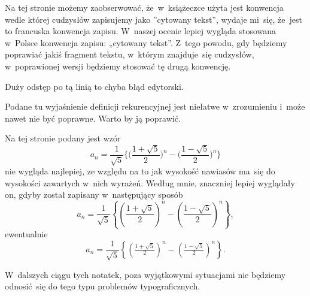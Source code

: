 \documentclass[a4paper,11pt]{article}
\numberwithin{equation}{section}
\begin{document}
\VerSpaceFour





\noindent
{} Na tej stronie możemy zaobserwować, że~w~książeczce użyta jest
konwencja wedle której cudzysłów zapisujemy jako ”cytowany tekst”, wydaje
mi~się, że~jest to francuska konwencja zapisu. W~naszej ocenie lepiej
wygląda stosowana w~Polsce konwencja zapisu: „cytowany tekst”. Z~tego
powodu, gdy będziemy poprawiać jakiś fragment tekstu, w~którym znajduje~się
cudzysłów, w~poprawionej wersji będziemy stosować tę drugą konwencję.

\VerSpaceFour





\noindent
{} Duży odstęp po tą linią to chyba błąd edytorski.

\VerSpaceFour





\noindent
{} Podane tu wyjaśnienie definicji rekurencyjnej jest niełatwe
w~zrozumieniu i~może nawet nie być poprawne. Warto by ją poprawić.

\VerSpaceFour





\noindent
{} Na tej stronie podany jest wzór
\begin{equation}
  \label{eq:Gancarzewicz-Arytmetyka-01}
  a_{ n } =
  \frac{ 1 }{ \sqrt{ 5 } }
  \Big\{ \Big( \frac{ 1 + \sqrt{ 5 } }{ 2 } \Big)^{ n }
  - \Big( \frac{ 1 - \sqrt{5} }{ 2 } \Big)^{ n } \Big\}
\end{equation}
nie wygląda najlepiej, ze względu na to jak wysokość nawiasów ma~się
do wysokości zawartych w~nich wyrażeń. Według mnie, znaczniej lepiej
wyglądały on, gdyby został zapisany w~następujący sposób
\begin{equation}
  \label{eq:Gancarzewicz-Arytmetyka-01}
  a_{ n } =
  \frac{ 1 }{ \sqrt{ 5 } }
  \left\{ \left( \frac{ 1 + \sqrt{ 5 } }{ 2 } \right)^{ n }
  - \left( \frac{ 1 - \sqrt{5} }{ 2 } \right)^{ n } \right\},
\end{equation}
ewentualnie
\begin{equation}
  \label{eq:Gancarzewicz-Arytmetyka-02}
  a_{ n } =
  \frac{ 1 }{ \sqrt{ 5 } }
  \left\{ \left( \tfrac{ 1 + \sqrt{ 5 } }{ 2 } \right)^{ n }
  - \left( \tfrac{ 1 - \sqrt{5} }{ 2 } \right)^{ n } \right\}.
\end{equation}

W~dalszych ciągu tych notatek, poza wyjątkowymi sytuacjami nie będziemy
odnosić~się do tego typu problemów typograficznych.
\end{document}
